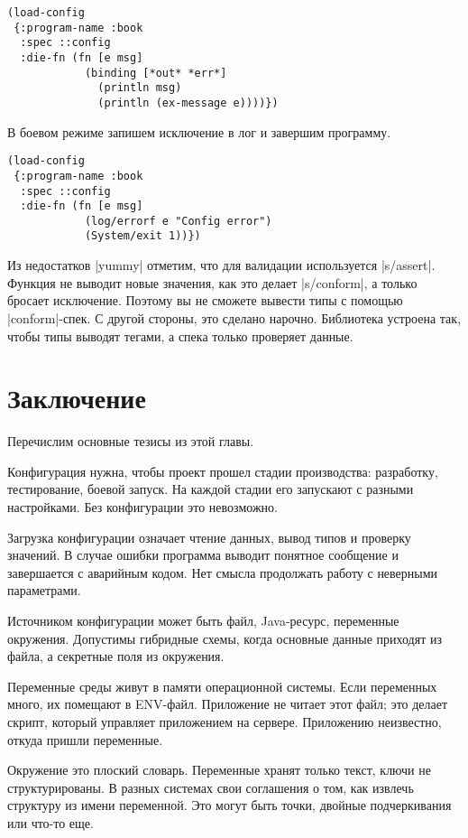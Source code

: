 \begin{verbatim}
(load-config
 {:program-name :book
  :spec ::config
  :die-fn (fn [e msg]
            (binding [*out* *err*]
              (println msg)
              (println (ex-message e))))})
\end{verbatim}

В боевом режиме запишем исключение в лог и завершим программу.

\begin{verbatim}
(load-config
 {:program-name :book
  :spec ::config
  :die-fn (fn [e msg]
            (log/errorf e "Config error")
            (System/exit 1))})
\end{verbatim}

Из недостатков \spverb|yummy| отметим, что для валидации используется
\spverb|s/assert|. Функция не выводит новые значения, как это делает
\spverb|s/conform|, а только бросает исключение. Поэтому вы не сможете вывести
типы с помощью \spverb|conform|-спек. С другой стороны, это сделано
нарочно. Библиотека устроена так, чтобы типы выводят тегами, а спека только
проверяет данные.

\section{Заключение}

Перечислим основные тезисы из этой главы.

Конфигурация нужна, чтобы проект прошел стадии производства: разработку,
тестирование, боевой запуск. На каждой стадии его запускают с разными
настройками. Без конфигурации это невозможно.

Загрузка конфигурации означает чтение данных, вывод типов и проверку значений. В
случае ошибки программа выводит понятное сообщение и завершается с аварийным
кодом. Нет смысла продолжать работу с неверными параметрами.

Источником конфигурации может быть файл, Java-ресурс, переменные
окружения. Допустимы гибридные схемы, когда основные данные приходят из файла, а
секретные поля из окружения.

Переменные среды живут в памяти операционной системы. Если переменных много, их
помещают в ENV-файл. Приложение не читает этот файл; это делает скрипт, который
управляет приложением на сервере. Приложению неизвестно, откуда пришли
переменные.

Окружение это плоский словарь. Переменные хранят только текст, ключи не
структурированы. В разных системах свои соглашения о том, как извлечь структуру
из имени переменной. Это могут быть точки, двойные подчеркивания или что-то еще.

